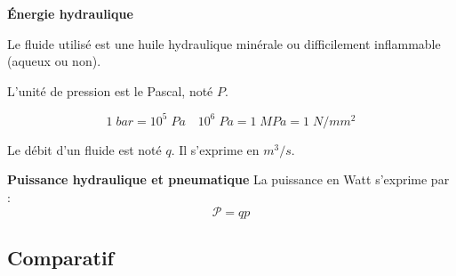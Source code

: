 \documentclass[10pt]{article}
\begin{document}
\begin{defi}
\textbf{Énergie hydraulique}

Le fluide utilisé est une huile hydraulique minérale ou difficilement inflammable (aqueux ou non).
\end{defi}

L'unité de pression est le Pascal, noté $P$.
\begin{resultat}
$$
1\; bar = 10^5\; Pa \quad 10^6 \; Pa = 1 \; MPa = 1\; N/mm^2
$$
\end{resultat}

Le débit d'un fluide est noté $q$. Il s'exprime en $m^3/s$. 

\begin{resultat}
\textbf{Puissance hydraulique et pneumatique}
La puissance en Watt s'exprime par :
$$ 
\mathcal{P} = qp
$$


\end{resultat}

\subsection{Comparatif}
\end{document}
